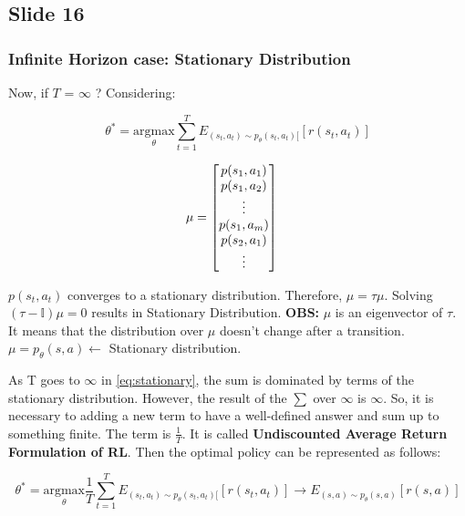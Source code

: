 \documentclass[]{article}
\begin{document}
\subsection*{Slide 16}%
\label{sub:Slide 16}

\subsubsection*{Infinite Horizon case: Stationary Distribution}
\label{sub:Infinite Horizon case: Stationary Distribution}
\par Now, if $\mathit{T}$ = $\infty$ ? Considering:

\begin{equation}
    \label{eq:stationary}
    \theta^{*} =\underset{\theta}{\text{argmax}}\sum_{t=1}^{T}\mathit{E_{(s_{t},a_{t})\sim p_{\theta}(s_{t},a_{t})[}} [r(s_{t},a_{t})] 
\end{equation}


\begin{align}
    \label{eq:mu}
    \mu & = \begin{bmatrix}
        $$p(s_{1},a_{1})$$ \\
        $$p(s_{1},a_{2})$$ \\
        \vdots \\
        $$p(s_{1},a_{m})$$ \\
        $$p(s_{2},a_{1})$$ \\
        \vdots \\
            \end{bmatrix}
\end{align}

\par $p(s_{t},a_{t})$ converges to a stationary distribution. Therefore, $\mu=\tau\mu$. Solving $(\tau - 
\mathbb{I})\mu = 0$ results in Stationary Distribution. \textbf{OBS:} $\mu$ is an eigenvector of $\tau$.  It means that the
distribution over $\mu$ doesn't change after a transition. $\mu = p_{\theta}(s,a) \leftarrow$ Stationary distribution.
\par 
As T goes to $\infty$ in \eqref{eq:stationary}, the sum is dominated by terms of the stationary distribution. However, the
result of the $\sum$ over $\infty$ is $\infty$. So, it is necessary to adding a new term to have a well-defined answer and sum up
to something finite. The term
is $\frac{1}{T}$. It is called \textbf{Undiscounted Average Return Formulation of RL}. Then the optimal policy can be
represented as follows:

\begin{equation}
    \label{eq:stationary2}
    \theta^{*} =\underset{\theta}{\text{argmax}}\frac{1}{T}\sum_{t=1}^{T}\mathit{E_{(s_{t},a_{t})\sim p_{\theta}(s_{t},a_{t})[}}
    [r(s_{t},a_{t})]  \rightarrow \mathit{E}_{(s,a) \sim p_{\theta}(s,a)}[r(s,a)]
\end{equation}
\end{document}

